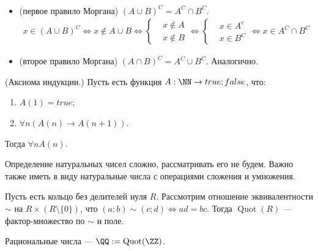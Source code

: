 \documentclass[12pt,a4paper]{article}
\DeclareMathOperator{\Quot}{Quot}
\begin{document}
    \begin{corollary*}\ 
        \begin{itemize}
            \item (первое правило Моргана) $(A\cup B)^C = A^C \cap B^C$.
                \begin{align*}
                    x\in (A\cup B)^C \Leftrightarrow
                    x \notin A \cup B \Leftrightarrow
                    \left\{ \begin{aligned}
                        &x \notin A\\
                        &x \notin B
                    \end{aligned}\right. \Leftrightarrow
                    \left\{ \begin{aligned}
                        &x \in A^c\\
                        &x \in B^C
                    \end{aligned} \right. \Leftrightarrow
                    x \in A^C \cap B^C
                \end{align*}
            \item (второе правило Моргана) $(A\cap B)^C = A^C \cup B^C$. Аналогично.
        \end{itemize}
    \end{corollary*}

    \begin{definition}
        (Аксиома индукции.) Пусть есть функция $A: \NN \to {true;false}$, что:
        \begin{enumerate}
            \item $A(1)=true$;
            \item $\forall n (A(n) \rightarrow A(n+1))$.
        \end{enumerate}
        Тогда $\forall n A(n)$.
    \end{definition}

    Определение натуральных чисел сложно, рассматривать его не будем. Важно также иметь в виду натуральные числа с операциями сложения и умножения.

    \begin{definition}
        Пусть есть кольцо без делителей нуля $R$. Рассмотрим отношение эквивалентности $\sim$ на $R \times (R\setminus \{0\})$, что $(a; b) \sim (c; d) \Leftrightarrow ad = bc$. Тогда $\Quot(R)$ --- фактор-множество по $\sim$ и поле.
    \end{definition}

    \begin{definition}
        Рациональные числа --- $\QQ := \Quot(\ZZ)$.
    \end{definition}
\end{document}
